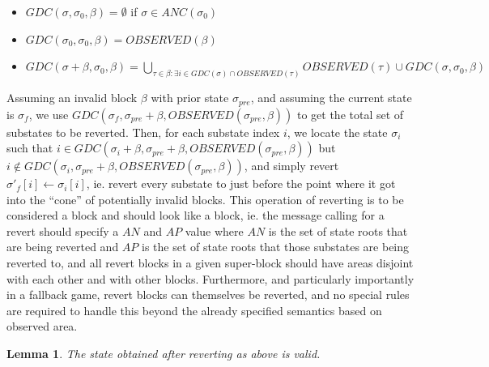 \documentclass[11pt,a4paper]{report}
\theoremstyle{plain}
\newtheorem{lem}[thm]{Lemma}
\theoremstyle{definition}
\theoremstyle{remark}
\begin{document}
\begin{itemize}
\item
$GDC(\sigma, \sigma_0, \beta) = \emptyset$ if $\sigma \in ANC(\sigma_0)$
\item
$GDC(\sigma_0, \sigma_0, \beta) = OBSERVED(\beta)$
\item
$GDC(\sigma + \beta, \sigma_0, \beta) = \bigcup_{\tau \in \beta: \exists i \in GDC(\sigma) \cap OBSERVED(\tau)} OBSERVED(\tau) \cup GDC(\sigma, \sigma_0, \beta)$
\end{itemize}

Assuming an invalid block $\beta$ with prior state $\sigma_{pre}$, and assuming the current state is $\sigma_f$, we use $GDC(\sigma_f, \sigma_{pre} + \beta, OBSERVED(\sigma_{pre}, \beta))$ to get the total set of substates to be reverted. Then, for each substate index $i$, we locate the state $\sigma_i$ such that $i \in GDC(\sigma_i + \beta, \sigma_{pre} + \beta, OBSERVED(\sigma_{pre}, \beta))$ but $i \notin GDC(\sigma_i, \sigma_{pre} + \beta, OBSERVED(\sigma_{pre}, \beta))$, and simply revert $\sigma'_f[i] \leftarrow \sigma_i[i]$, ie. revert every substate to just before the point where it got into the ``cone'' of potentially invalid blocks. This operation of reverting is to be considered a block and should look like a block, ie. the message calling for a revert should specify a $AN$ and $AP$ value where $AN$ is the set of state roots that are being reverted and $AP$ is the set of state roots that those substates are being reverted to, and all revert blocks in a given super-block should have areas disjoint with each other and with other blocks. Furthermore, and particularly importantly in a fallback game, revert blocks can themselves be reverted, and no special rules are required to handle this beyond the already specified semantics based on observed area.

\begin{lem}
The state obtained after reverting as above is valid.
\end{lem}
\end{document}
